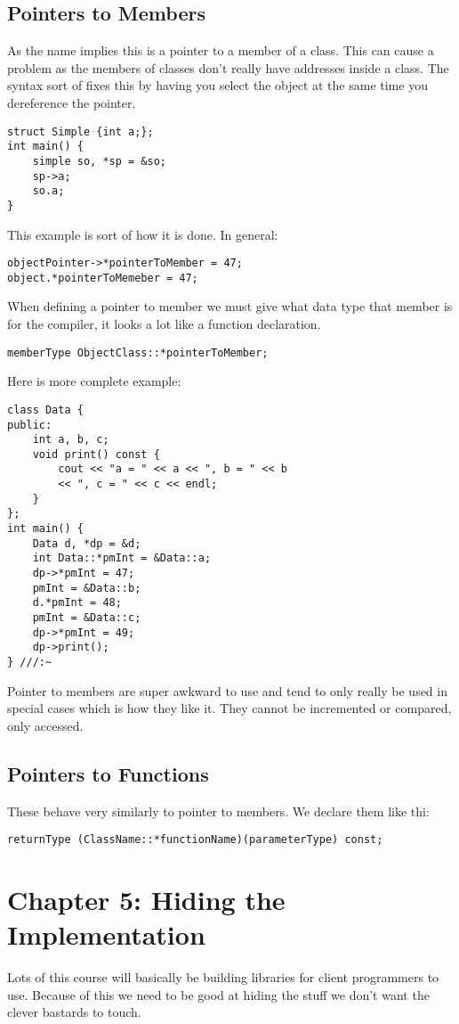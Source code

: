 \documentclass[12pt]{article}
\begin{document}
\subsection*{Pointers to Members}
As the name implies this is a pointer to a member of a class. This can cause a problem as the members of classes don't really have addresses inside a class. The syntax sort of fixes this by having you select the object at the same time you dereference the pointer.
\begin{lstlisting}
struct Simple {int a;};
int main() {
    simple so, *sp = &so;
    sp->a;
    so.a;
}
\end{lstlisting}
This example is sort of how it is done. In general:
\begin{lstlisting}
objectPointer->*pointerToMember = 47;
object.*pointerToMemeber = 47;
\end{lstlisting}
When defining a pointer to member we must give what data type that member is for the compiler, it looks a lot like a function declaration.
\begin{lstlisting}
memberType ObjectClass::*pointerToMember;
\end{lstlisting}
Here is more complete example:
\begin{lstlisting}
class Data {
public:
    int a, b, c;
    void print() const {
        cout << "a = " << a << ", b = " << b
        << ", c = " << c << endl;
    }
};
int main() {
    Data d, *dp = &d;
    int Data::*pmInt = &Data::a;
    dp->*pmInt = 47;
    pmInt = &Data::b;
    d.*pmInt = 48;
    pmInt = &Data::c;
    dp->*pmInt = 49;
    dp->print();
} ///:~
\end{lstlisting}
Pointer to members are super awkward to use and tend to only really be used in special cases which is how they like it. They cannot be incremented or compared, only accessed.

\subsection*{Pointers to Functions}
These behave very similarly to pointer to members. We declare them like thi:
\begin{lstlisting}
returnType (ClassName::*functionName)(parameterType) const;
\end{lstlisting}


\section*{Chapter 5: Hiding the Implementation}
Lots of this course will basically be building libraries for client programmers to use. Because of this we need to be good at hiding the stuff we don't want the clever bastards to touch.
\end{document}
